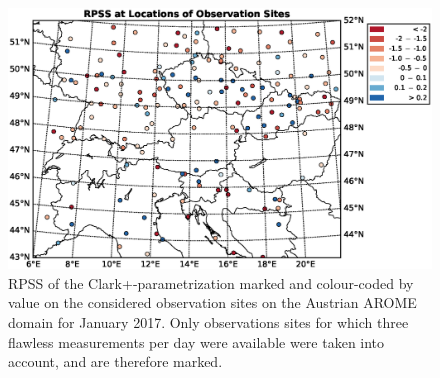 \begin{figure}[h]
    \centering
    \includegraphics[width=\textwidth]{graphics/results/Rated_stations-201701.eps}
    \caption[Stations Marked with RPSS for January 2017]{RPSS of the Clark+-parametrization marked and colour-coded by value on the considered observation sites on the Austrian AROME domain for January 2017. Only observations sites for which three flawless measurements per day were available were taken into account, and are therefore marked. }
    \label{fig: Stations_jan}
\end{figure}

